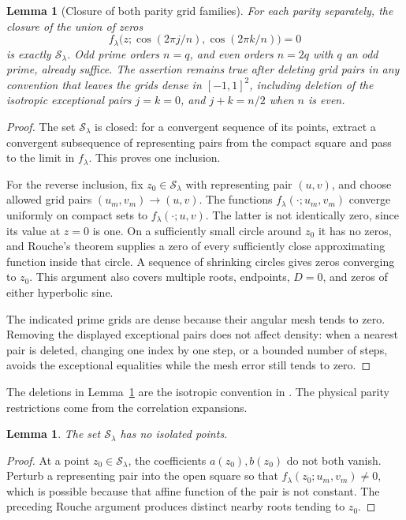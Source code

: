 \documentclass[11pt]{article}
\numberwithin{equation}{section}
\newtheorem{lemma}[theorem]{Lemma}
\theoremstyle{definition}
\newcommand{\cS}{\mathcal S}
\begin{document}
\begin{lemma}[Closure of both parity grid families]\label{lem:gridclosure}
For each parity separately, the closure of the union of zeros
\[
 f_\lambda\bigl(z;\cos(2\pi j/n),\cos(2\pi k/n)\bigr)=0
\]
is exactly \(\cS_\lambda\). Odd prime orders \(n=q\), and even orders
\(n=2q\) with \(q\) an odd prime, already suffice. The assertion remains
true after deleting grid pairs in any convention that leaves the grids
dense in \([-1,1]^2\), including deletion of the isotropic exceptional
pairs \(j=k=0\), and \(j+k=n/2\) when \(n\) is even.
\end{lemma}
\begin{proof}
The set \(\cS_\lambda\) is closed: for a convergent sequence of its
points, extract a convergent subsequence of representing pairs from the
compact square and pass to the limit in \(f_\lambda\).
This proves one inclusion.

For the reverse inclusion, fix \(z_0\in\cS_\lambda\) with representing
pair \((u,v)\), and choose allowed grid pairs \((u_m,v_m)\to(u,v)\).
The functions \(f_\lambda(\cdot;u_m,v_m)\) converge uniformly on compact
sets to \(f_\lambda(\cdot;u,v)\). The latter is not identically zero,
since its value at \(z=0\) is one. On a sufficiently small circle around
\(z_0\) it has no zeros, and Rouche's theorem supplies a zero of every
sufficiently close approximating function inside that circle. A sequence
of shrinking circles gives zeros converging to \(z_0\). This argument
also covers multiple roots, endpoints, \(D=0\), and zeros of either
hyperbolic sine.

The indicated prime grids are dense because their angular mesh tends
to zero. Removing the displayed exceptional pairs does not affect
density: when a nearest pair is deleted, changing one index by one
step, or a bounded number of steps, avoids the exceptional equalities
while the mesh error still tends to zero.
\end{proof}

The deletions in Lemma~\ref{lem:gridclosure} are the isotropic
convention in \cite[eq.~(52)]{BHM}. The physical parity restrictions
come from the correlation expansions.

\begin{lemma}\label{lem:noisolatedS}
The set \(\cS_\lambda\) has no isolated points.
\end{lemma}
\begin{proof}
At a point \(z_0\in\cS_\lambda\), the coefficients \(a(z_0),b(z_0)\)
do not both vanish. Perturb a representing pair into the open square
so that \(f_\lambda(z_0;u_m,v_m)\ne0\), which is possible because that
affine function of the pair is not constant. The preceding Rouche
argument produces distinct nearby roots tending to \(z_0\).
\end{proof}
\end{document}
